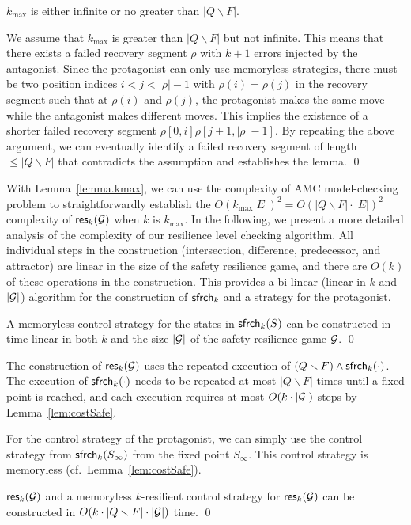 \begin{lemma} \label{lemma.kmax} 
$k_{\max}$ is either infinite or no greater than $|Q\smallsetminus F|$.  
\end{lemma} 
\pf 
We assume that $k_{\max}$ is greater than $|Q\smallsetminus F|$ but not infinite. 
This means that there exists a failed recovery segment $\rho$ 
with $k+1$ errors injected by the antagonist. 
Since the protagonist can only use memoryless strategies, 
there must be two position indices $i<j<|\rho|-1$ with $\rho(i)=\rho(j)$ in the recovery segment 
such that at $\rho(i)$ and $\rho(j)$, 
the protagonist makes the same move while the antagonist makes different moves. 
This implies the existence of a shorter failed recovery segment $\rho[0,i]\rho[j+1,|\rho|-1]$.  
By repeating the above argument, we can eventually identify a failed recovery segment of length 
$\leq |Q\smallsetminus F|$ that contradicts the assumption and establishes the lemma. 
\qed 

With Lemma~\ref{lemma.kmax}, we can use the complexity of AMC model-checking problem \cite{AHK02} 
to 
straightforwardly establish the $O(k_{\max} |E|)^2=O(|Q\smallsetminus F|\cdot|E|)^2$ complexity of 
$\mathsf{res}_k({\cal G})$ when $k$ is $k_{\max}$.  
In the following, we present a more detailed analysis of the complexity of our 
resilience level checking algorithm. 
All individual steps in the construction 
(intersection, difference, predecessor, and attractor) 
are linear in the 
size of the safety resilience game, and 
there are $O(k)$ of these 
operations in the construction.  
This provides a bi-linear (linear in $k$ and $|{\cal G}|$) 
algorithm for the construction of $\mathsf{sfrch}_k$ and 
a strategy for the protagonist.  

\begin{lemma}
\label{lem:costSafe}
A memoryless control strategy for the states in $\mathsf{sfrch}_k(S)$ can be
constructed in time linear in both $k$ and the 
size $|{\cal G}|$ of the safety resilience game ${\cal G}$.
\qed
\end{lemma}





The construction of $\mathsf{res}_k({\cal G})$ uses the repeated execution 
of $(Q\smallsetminus F)\wedge\mathsf{sfrch}_k(\cdot)$.
The execution of $\mathsf{sfrch}_k(\cdot)$ needs to be repeated 
at most $|Q\smallsetminus F|$ times until a fixed point is reached, 
and each execution requires at most $O(k\cdot|{\cal G}|)$ 
steps by Lemma~\ref{lem:costSafe}.

For the control strategy of the protagonist, 
we can simply use the control strategy from $\mathsf{sfrch}_k(S_\infty)$ 
from the fixed point $S_\infty$.
This control strategy is memoryless (cf.\ Lemma~\ref{lem:costSafe}).
\begin{lemma}
\label{lem:costRes}
$\mathsf{res}_k({\cal G})$ and a memoryless $k$-resilient control strategy 
for $\mathsf{res}_k({\cal G})$ can be constructed 
in $O(k\cdot |Q\smallsetminus F| \cdot |{\cal G}|)$ time.
\qed
\end{lemma}


